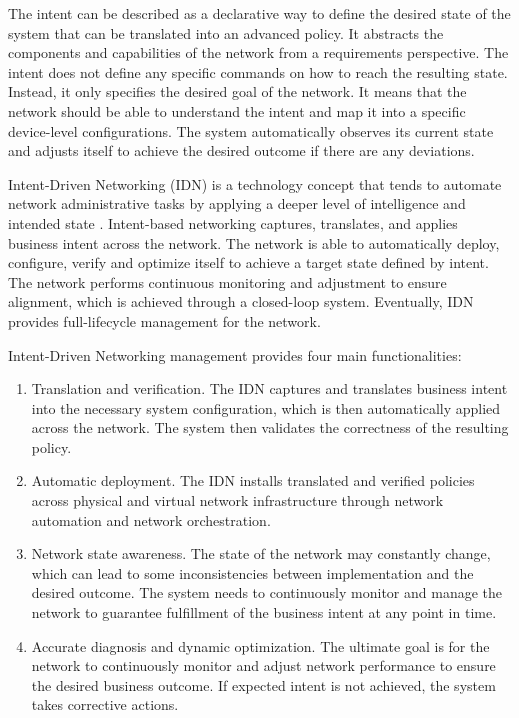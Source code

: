 The intent can be described as a declarative way to define the desired state of the system that can be translated into an advanced policy. It abstracts the components and capabilities of the network from a requirements perspective. The intent does not define any specific commands on how to reach the resulting state. Instead, it only specifies the desired goal of the network\cite{Mwanje2021}. It means that the network should be able to understand the intent and map it into a specific device-level configurations.  The system automatically observes its current state and adjusts itself to achieve the desired outcome if there are any deviations. \cite[22867]{8968429}

Intent-Driven Networking (IDN) is a technology concept that tends to automate network administrative tasks by applying a deeper level of intelligence and intended state \cite{Kolibri}\cite{2022}. Intent-based networking captures, translates, and applies business intent across the network. The network is able to automatically deploy, configure, verify and optimize itself to achieve a target state defined by intent. The network performs continuous monitoring and adjustment to ensure alignment, which is achieved through a closed-loop system. Eventually, IDN provides full-lifecycle management for the network.\cite{8968429}

Intent-Driven Networking management provides four main functionalities: 

\begin{enumerate}
	\item Translation and verification. The IDN captures and translates business intent into the necessary system configuration, which is then automatically applied across the network. The system then validates the correctness of the resulting policy.
	\item Automatic deployment. The IDN installs translated and verified policies across physical and virtual network infrastructure through network automation and network orchestration.
	\item Network state awareness. The state of the network may constantly change, which can lead to some inconsistencies between implementation and the desired outcome. The system needs to continuously monitor and manage the network to guarantee fulfillment of the business intent at any point in time.
	\item Accurate diagnosis and dynamic optimization. The ultimate goal is for the network to continuously monitor and adjust network performance to ensure the desired business outcome. If expected intent is not achieved, the system takes corrective actions. \cite[271]{Wei2020}
\end{enumerate}









